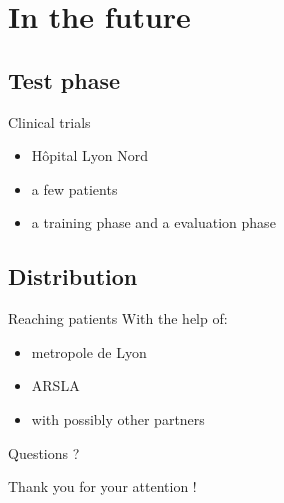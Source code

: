 \documentclass[notes]{beamer}
\begin{document}
\section{In the future}
\subsection{Test phase}
\begin{frame}{Clinical trials}
	\begin{center}
		\begin{itemize}
			\item Hôpital Lyon Nord %
			\item a few patients
			\item a training phase and a evaluation phase %
		\end{itemize}
	\end{center}
\end{frame}

\subsection{Distribution}
\begin{frame}{Reaching patients}
	With the help of: 
	\begin{itemize}
		\item metropole de Lyon
		\item ARSLA
		\item with possibly other partners %
	\end{itemize}
\end{frame}

\begin{frame}{Questions ?}
	\begin{center}
		Thank you for your attention !
	\end{center}
\end{frame}
\end{document}
